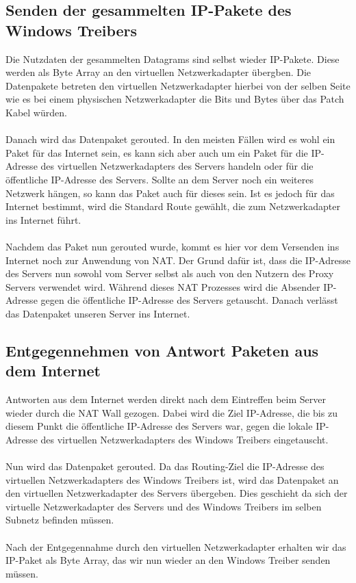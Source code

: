 \subsection{Senden der gesammelten IP-Pakete des Windows Treibers}
Die Nutzdaten der gesammelten Datagrams sind selbst wieder IP-Pakete. Diese werden als Byte Array an den virtuellen Netzwerkadapter übergben. Die Datenpakete betreten den virtuellen Netzwerkadapter hierbei von der selben Seite wie es bei einem physischen Netzwerkadapter die Bits und Bytes über das Patch Kabel würden.
\\\\  
Danach wird das Datenpaket gerouted. In den meisten Fällen wird es wohl ein Paket für das Internet sein, es kann sich aber auch um ein Paket für die IP-Adresse des virtuellen Netzwerkadapters des Servers handeln oder für die öffentliche IP-Adresse des Servers. Sollte an dem Server noch ein weiteres Netzwerk hängen, so kann das Paket auch für dieses sein. Ist es jedoch für das Internet bestimmt, wird die Standard Route gewählt, die zum Netzwerkadapter ins Internet führt. 
\\\\
Nachdem das Paket nun gerouted wurde, kommt es hier vor dem Versenden ins Internet noch zur Anwendung von NAT. Der Grund dafür ist, dass die IP-Adresse des Servers nun sowohl vom Server selbst als auch von den Nutzern des Proxy Servers verwendet wird. Während dieses NAT Prozesses wird die Absender IP-Adresse gegen die öffentliche IP-Adresse des Servers getauscht. Danach verlässt das Datenpaket unseren Server ins Internet.

\newpage
\subsection{Entgegennehmen von Antwort Paketen aus dem Internet}
Antworten aus dem Internet werden direkt nach dem Eintreffen beim Server wieder durch die NAT Wall gezogen. Dabei wird die Ziel IP-Adresse, die bis zu diesem Punkt die öffentliche IP-Adresse des Servers war, gegen die lokale IP-Adresse des virtuellen Netzwerkadapters des Windows Treibers eingetauscht.
\\\\ 
Nun wird das Datenpaket gerouted. Da das Routing-Ziel die IP-Adresse des   virtuellen Netzwerkadapters des Windows Treibers ist, wird das Datenpaket an den virtuellen Netzwerkadapter des Servers übergeben. Dies geschieht da sich der virtuelle Netzwerkadapter des Servers und des Windows Treibers im selben Subnetz befinden müssen.  
\\\\
Nach der Entgegennahme durch den virtuellen Netzwerkadapter erhalten wir das IP-Paket als Byte Array, das wir nun wieder an den Windows Treiber senden müssen.

